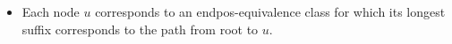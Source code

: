 \vspace{1em}
\sffamily
\begin{itemize}[label={\bullet}]
  \item Each node $u$ corresponds to an endpos-equivalence class for which its longest suffix corresponds to the path from root to $u$.
\end{itemize}